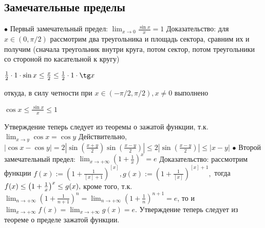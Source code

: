 \documentclass[12pt]{article}
\begin{document}
\subsection{Замечательные пределы}
$\bullet$ Первый замечательный предел: $\lim_{x \to 0}\frac{\sin x}{x} = 1$ \newline
Доказательство: для $x \in (0, \pi/2)$ рассмотрим два треугольника и площадь сектора, сравним их и получим (сначала треугольник внутри круга, потом сектор, потом треугольники со стороной по касательной к кругу)
\begin{center}
$\frac12 \cdot 1 \cdot \sin x \leq \frac{x}2\leq \frac12 \cdot 1 \cdot \tg x$
\end{center}
откуда, в силу четности при $x \in (-\pi/2, \pi/2), x \not = 0$ выполнено
\begin{center}
$\cos x \leq \frac{\sin x}{x} \leq 1$
\end{center}
Утверждение теперь следует из теоремы о зажатой функции, т.к. $\lim_{x \to y} \cos x = \cos y$\newline
Действительно, $|\cos x - \cos y| = 2|\sin{(\frac{x+y}{2})}\sin{(\frac{x-y}{2})}| \leq 2|\sin{(\frac{x-y}{2})}|\leq |x - y|$\newline\newline
$\bullet$ Второй замечательный предел: $\lim _{x \to +\infty}\left(1 + \frac1x\right)^x = e$\newline
Доказательство: рассмотрим функции $f(x) := (1 + \frac{1}{[x] + 1})^{[x]}, g(x) := (1 + \frac{1}{[x]})^{[x] + 1}, $ тогда $ \newline
f(x) \leq \left(1 + \frac1x\right)^x \leq g(x), $ кроме того, т.к.  $\lim_{n \to +\infty} (1 + \frac{1}{n + 1})^{n} = \lim_{n \to +\infty} (1 + \frac{1}{n})^{n + 1} = e$, то и $\lim_{x \to +\infty} f(x) = \lim_{x \to +\infty} g(x) =e$. Утверждение теперь следует из теореме о пределе зажатой функции.
\end{document}
